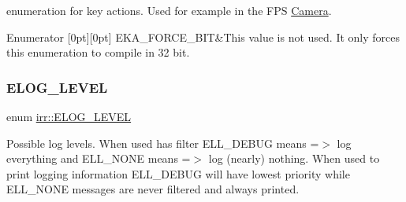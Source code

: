 enumeration for key actions. Used for example in the F\+PS \hyperlink{classCamera}{Camera}. 

\begin{DoxyEnumFields}{Enumerator}
[0pt][0pt]{}\mbox{\label{namespaceirr_aa9946ac9f3142f9e790ce52d59fd6168a27e7067f9bc0bc5143b0bac183ca6c6b}} 
E\+K\+A\+\_\+\+F\+O\+R\+C\+E\+\_\+B\+IT&This value is not used. It only forces this enumeration to compile in 32 bit. \\
\hline

\end{DoxyEnumFields}
\mbox{\label{namespaceirr_aa2d1cac68606a25ed24cfffccfa30a92}} 
\subsubsection{\texorpdfstring{E\+L\+O\+G\+\_\+\+L\+E\+V\+EL}{ELOG\_LEVEL}}
{\footnotesize\ttfamily enum \hyperlink{namespaceirr_aa2d1cac68606a25ed24cfffccfa30a92}{irr\+::\+E\+L\+O\+G\+\_\+\+L\+E\+V\+EL}}



Possible log levels. When used has filter E\+L\+L\+\_\+\+D\+E\+B\+UG means =$>$ log everything and E\+L\+L\+\_\+\+N\+O\+NE means =$>$ log (nearly) nothing. When used to print logging information E\+L\+L\+\_\+\+D\+E\+B\+UG will have lowest priority while E\+L\+L\+\_\+\+N\+O\+NE messages are never filtered and always printed. 

